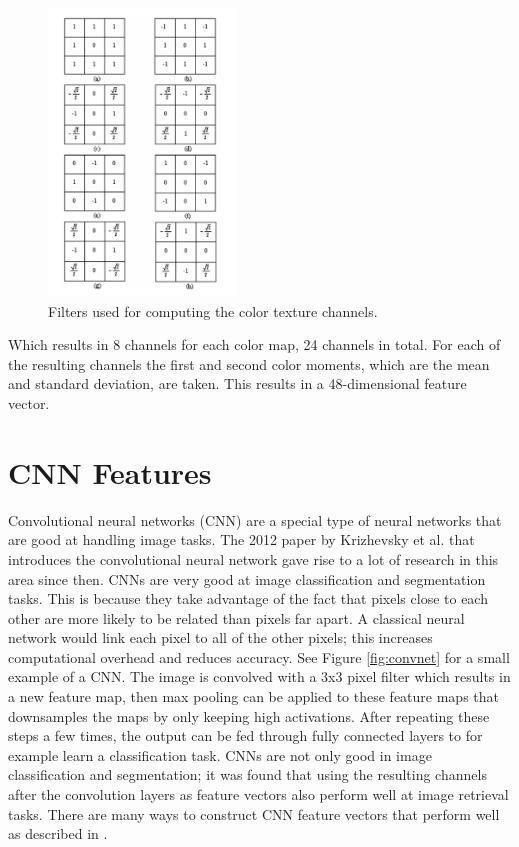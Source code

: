 \documentclass{report}
\begin{document}
\begin{figure}[H]
	\includegraphics[width=5cm]{images/filters.png}
	\centering
	\caption{Filters used for computing the color texture channels.}
	\label{fig:filters}
\end{figure}

Which results in 8 channels for each color map, 24 channels in total. For each of the resulting channels the first and second color moments, which are the mean and standard deviation, are taken. This results in a 48-dimensional feature vector.

\section{CNN Features} \label{subsection:cnnfeatures}
Convolutional neural networks (CNN) are a special type of neural networks that are good at handling image tasks. The 2012 paper by Krizhevsky et al. \cite{krizhevsky2012imagenet} that introduces the convolutional neural network gave rise to a lot of research in this area since then. CNNs are very good at image classification and segmentation tasks. This is because they take advantage of the fact that pixels close to each other are more likely to be related than pixels far apart. A classical neural network would link each pixel to all of the other pixels; this increases computational overhead and reduces accuracy. See Figure \ref{fig:convnet} for a small example of a CNN. The image is convolved with a 3x3 pixel filter which results in a new feature map, then max pooling can be applied to these feature maps that downsamples the maps by only keeping high activations. After repeating these steps a few times, the output can be fed through fully connected layers to for example learn a classification task. CNNs are not only good in image classification and segmentation; it was found that using the resulting channels after the convolution layers as feature vectors also perform well at image retrieval tasks. There are many ways to construct CNN feature vectors that perform well as described in \cite{zheng2018sift}.
\end{document}
